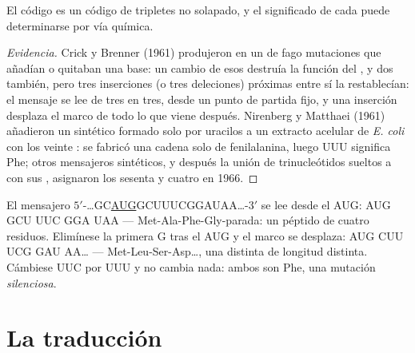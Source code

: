 \begin{proposition}\label{prop:b1:gene-expression:nirenberg}
El código es un código de tripletes no solapado, y el significado de cada
 puede determinarse por vía química.
\end{proposition}
\begin{proof}[Evidencia]
Crick y Brenner (1961) produjeron en un  de fago mutaciones que añadían o
quitaban una base: un cambio de esos destruía la función del , y dos
también, pero tres inserciones (o tres deleciones) próximas entre sí la
restablecían: el mensaje se lee de tres en tres, desde un punto de partida
fijo, y una inserción desplaza el marco de todo lo que viene después.
Nirenberg y Matthaei (1961) añadieron un  sintético formado solo por
uracilos a un extracto acelular de \emph{E. coli} con los veinte
: se fabricó una cadena solo de fenilalanina, luego UUU significa
Phe; otros mensajeros sintéticos, y después la unión de trinucleótidos
sueltos a  con sus , asignaron los sesenta y
cuatro en 1966.
\end{proof}

\begin{example}\label{ex:b1:gene-expression:reading}
El mensajero $5'$-\ldots{}GC\underline{AUG}GCUUUCGGAUAA\ldots{}-$3'$ se lee
desde el AUG: AUG GCU UUC GGA UAA --- Met-Ala-Phe-Gly-parada: un péptido de
cuatro residuos. Elimínese la primera G tras el AUG y el marco se desplaza:
AUG CUU UCG GAU AA\ldots{} --- Met-Leu-Ser-Asp\ldots, una  distinta
de longitud distinta. Cámbiese UUC por UUU y no cambia nada: ambos son Phe,
una mutación \emph{silenciosa}.
\end{example}

\section{La traducción}

